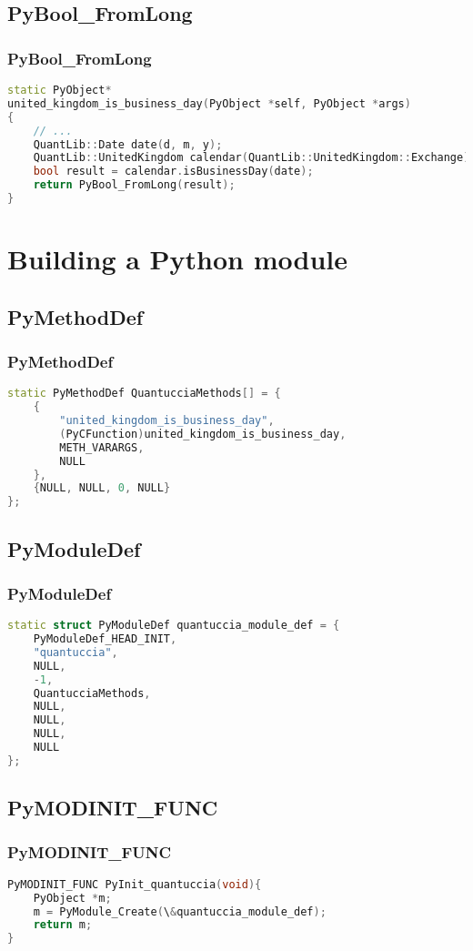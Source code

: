 \documentclass{beamer}
\begin{document}
	\subsection{PyBool\_FromLong}
	\begin{frame}[fragile]
		\frametitle{PyBool\_FromLong}
		\begin{lstlisting}[language=C++]
   static PyObject*
united_kingdom_is_business_day(PyObject *self, PyObject *args)
{
    // ...
    QuantLib::Date date(d, m, y);
    QuantLib::UnitedKingdom calendar(QuantLib::UnitedKingdom::Exchange);
    bool result = calendar.isBusinessDay(date);
    return PyBool_FromLong(result);
}
 		\end{lstlisting}
	\end{frame}


	\section{Building a Python module}

	\subsection{PyMethodDef}
	\begin{frame}[fragile]
		\frametitle{PyMethodDef}
		\begin{lstlisting}[language=C++]
static PyMethodDef QuantucciaMethods[] = {
    {
        "united_kingdom_is_business_day",
        (PyCFunction)united_kingdom_is_business_day,
        METH_VARARGS,
        NULL
    },
    {NULL, NULL, 0, NULL}
};
		\end{lstlisting}
	\end{frame}

	\subsection{PyModuleDef}
	\begin{frame}[fragile]
		\frametitle{PyModuleDef}
		\begin{lstlisting}[language=C++]
static struct PyModuleDef quantuccia_module_def = {
    PyModuleDef_HEAD_INIT,
    "quantuccia",
    NULL,
    -1,
    QuantucciaMethods,
    NULL,
    NULL,
    NULL,
    NULL
};
		\end{lstlisting}
	\end{frame}

	\subsection{PyMODINIT\_FUNC}
	\begin{frame}[fragile]
		\frametitle{PyMODINIT\_FUNC}
		\begin{lstlisting}[language=C++]
PyMODINIT_FUNC PyInit_quantuccia(void){
    PyObject *m;
    m = PyModule_Create(\&quantuccia_module_def);
    return m;
}
		\end{lstlisting}
	\end{frame}
\end{document}

